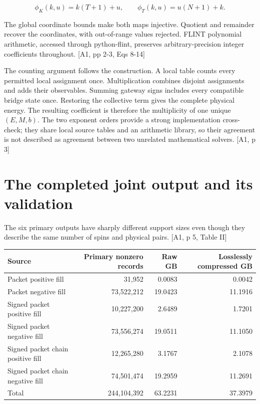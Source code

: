 \[\phi_K(k,u)=k(T+1)+u,\qquad \phi_T(k,u)=u(N+1)+k.\]

The global coordinate bounds make both maps injective. Quotient and remainder recover the coordinates, with out-of-range values rejected. FLINT polynomial arithmetic, accessed through python-flint, preserves arbitrary-precision integer coefficients throughout. {[}A1, pp 2-3, Eqs 8-14{]}

The counting argument follows the construction. A local table counts every permitted local assignment once. Multiplication combines disjoint assignments and adds their observables. Summing gateway signs includes every compatible bridge state once. Restoring the collective term gives the complete physical energy. The resulting coefficient is therefore the multiplicity of one unique \((E,M,b)\). The two exponent orders provide a strong implementation cross-check; they share local source tables and an arithmetic library, so their agreement is not described as agreement between two unrelated mathematical solvers. {[}A1, p 3{]}

\section{The completed joint output and its validation}\label{the-completed-joint-output-and-its-validation}

The six primary outputs have sharply different support sizes even though they describe the same number of spins and physical pairs. {[}A1, p 5, Table II{]}

\begin{longtable}[]{@{}lrrr@{}}
\toprule\noalign{}
Source & Primary nonzero records & Raw GB & Losslessly compressed GB \\
\midrule\noalign{}
\endhead
\bottomrule\noalign{}
\endlastfoot
Packet positive fill & 31,952 & 0.0083 & 0.0042 \\
Packet negative fill & 73,522,212 & 19.0423 & 11.1916 \\
Signed packet positive fill & 10,227,200 & 2.6489 & 1.7201 \\
Signed packet negative fill & 73,556,274 & 19.0511 & 11.1050 \\
Signed packet chain positive fill & 12,265,280 & 3.1767 & 2.1078 \\
Signed packet chain negative fill & 74,501,474 & 19.2959 & 11.2691 \\
Total & 244,104,392 & 63.2231 & 37.3979 \\
\end{longtable}

